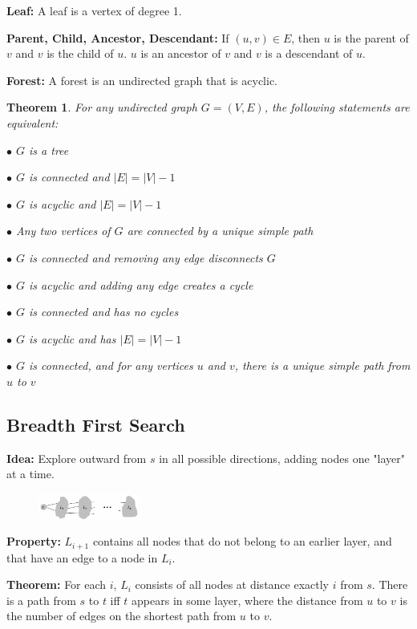 \documentclass[10pt]{article}
\newtheorem*{theorem}{Theorem}
\begin{document}
\textbf{Leaf:} A leaf is a vertex of degree 1.

\textbf{Parent, Child, Ancestor, Descendant:} If $(u, v) \in E$, then $u$ is the parent of $v$ and $v$ is the child of $u$. $u$ is an ancestor of $v$ and $v$ is a descendant of $u$.

\textbf{Forest:} A forest is an undirected graph that is acyclic.

\begin{theorem}
	For any undirected graph $G = (V, E)$, the following statements are equivalent:
	
	$\bullet$ $G$ is a tree
	
	$\bullet$ $G$ is connected and $|E| = |V| - 1$
	
	$\bullet$ $G$ is acyclic and $|E| = |V| - 1$
	
	$\bullet$ Any two vertices of $G$ are connected by a unique simple path
	
	$\bullet$ $G$ is connected and removing any edge disconnects $G$
	
	$\bullet$ $G$ is acyclic and adding any edge creates a cycle
	
	$\bullet$ $G$ is connected and has no cycles
	
	$\bullet$ $G$ is acyclic and has $|E| = |V| - 1$
	
	$\bullet$ $G$ is connected, and for any vertices $u$ and $v$, there is a unique simple path from $u$ to $v$
\end{theorem}

\subsection{Breadth First Search}

\textbf{Idea:} Explore outward from $s$ in all possible directions, adding nodes one "layer" at a time.

\begin{figure}
	\centering
	\includegraphics[width=0.3\textwidth]{img7-1}
\end{figure}

\textbf{Property:} $L_{i+1}$ contains all nodes that do not belong to an earlier layer, and that have an edge to a node in $L_i$.

\textbf{Theorem:}  For each $i$, $L_i$ consists of all nodes at distance exactly $i$ from $s$. There is a path from $s$ to $t$ iff $t$ appears in some layer, where the distance from $u$ to $v$ is the number of edges on the shortest path from $u$ to $v$.
\end{document}
